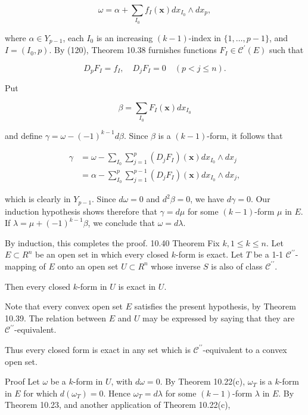 \documentclass[10pt]{article}
\begin{document}
$$
\omega=\alpha+\sum_{I_{0}} f_{I}(\mathbf{x}) d x_{I_{0}} \wedge d x_{p},
$$

where $\alpha \in Y_{p-1}$, each $I_{0}$ is an increasing $(k-1)$-index in $\{1, \ldots, p-1\}$, and $I=\left(I_{0}, p\right)$. By (120), Theorem 10.38 furnishes functions $F_{I} \in \mathscr{C}^{\prime}(E)$ such that

$$
D_{p} F_{I}=f_{I}, \quad D_{j} F_{I}=0 \quad(p<j \leq n) .
$$

Put

$$
\beta=\sum_{I_{0}} F_{I}(\mathbf{x}) d x_{I_{0}}
$$

and define $\gamma=\omega-(-1)^{k-1} d \beta$. Since $\beta$ is a $(k-1)$-form, it follows that

$$
\begin{aligned}
\gamma & =\omega-\sum_{I_{0}} \sum_{j=1}^{p}\left(D_{j} F_{I}\right)(\mathbf{x}) d x_{I_{0}} \wedge d x_{j} \\
& =\alpha-\sum_{I_{0}}^{p} \sum_{j=1}^{p-1}\left(D_{j} F_{I}\right)(\mathbf{x}) d x_{I_{0}} \wedge d x_{j},
\end{aligned}
$$

which is clearly in $Y_{p-1}$. Since $d \omega=0$ and $d^{2} \beta=0$, we have $d \gamma=0$. Our induction hypothesis shows therefore that $\gamma=d \mu$ for some $(k-1)$-form $\mu$ in $E$. If $\lambda=\mu+(-1)^{k-1} \beta$, we conclude that $\omega=d \lambda$.

By induction, this completes the proof. 10.40 Theorem Fix $k, 1 \leq k \leq n$. Let $E \subset R^{n}$ be an open set in which every closed $k$-form is exact. Let $T$ be a 1-1 $\mathscr{C}^{\prime \prime}$-mapping of $E$ onto an open set $U \subset R^{n}$ whose inverse $S$ is also of class $\mathscr{C}^{\prime \prime}$.

Then every closed $k$-form in $U$ is exact in $U$.

Note that every convex open set $E$ satisfies the present hypothesis, by Theorem 10.39. The relation between $E$ and $U$ may be expressed by saying that they are $\mathscr{C}^{\prime \prime}$-equivalent.

Thus every closed form is exact in any set which is $\mathscr{C}^{\prime \prime}$-equivalent to a convex open set.

Proof Let $\omega$ be a $k$-form in $U$, with $d \omega=0$. By Theorem 10.22(c), $\omega_{T}$ is a $k$-form in $E$ for which $d\left(\omega_{T}\right)=0$. Hence $\omega_{T}=d \lambda$ for some $(k-1)$-form $\lambda$ in $E$. By Theorem 10.23, and another application of Theorem 10.22(c),
\end{document}
